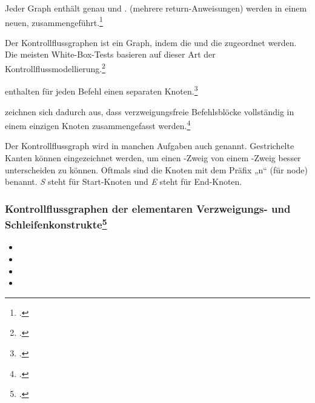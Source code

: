 \documentclass{bschlangaul-theorie}
\begin{document}
Jeder Graph enthält genau  und .  (\zB mehrere
return-Anweisungen) werden in einem neuen,  zusammengeführt.\footcite[Seite
203]{hoffmann:software}

Der  Kontrollﬂussgraphen ist ein Graph, indem
die  und die
 zugeordnet werden. Die
meisten White-Box-Tests basieren auf dieser Art der
Kontrollﬂussmodellierung.\footcite[Seite 203]{hoffmann:software}

 enthalten für jeden Befehl einen
separaten Knoten.\footcite[Seite 204]{hoffmann:software}

 zeichnen sich dadurch aus, dass
verzweigungsfreie Befehlsblöcke vollständig in einem einzigen Knoten
zusammengefasst werden.\footcite[Seite 204]{hoffmann:software}

Der Kontrollflussgraph wird in manchen Aufgaben auch
 genannt. Gestrichelte Kanten können
eingezeichnet werden, um einen -Zweig von einem
-Zweig besser unterscheiden zu können. Oftmals sind die
Knoten mit dem Präfix „n“ (für node) benannt. \emph{S} steht für
Start-Knoten und \emph{E} steht für End-Knoten.

\subsubsection{Kontrollflussgraphen der elementaren Verzweigungs- und
Schleifenkonstrukte\footcite[Seite 205]{hoffmann:software}}

\begin{itemize}
\item {}

\item {}

\item {}

\item {}
\end{itemize}
\end{document}
